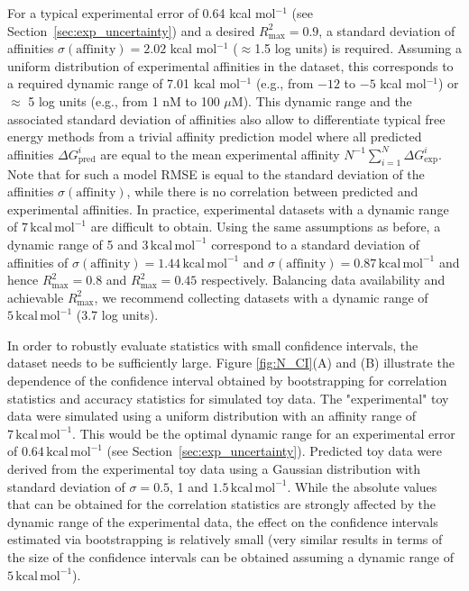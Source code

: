 \documentclass[9pt,bestpractices,pubversion]{livecoms}
\begin{document}
For a typical experimental error of 0.64 kcal mol$^{-1}$ (see Section~\ref{sec:exp_uncertainty}) and a desired $R^2_{\mathrm{max}} = 0.9$, a standard deviation of affinities $\sigma(\mathrm{affinity}) = 2.02 $ kcal mol$^{-1}$ ($\approx$1.5 log units) is required. Assuming a uniform distribution of experimental affinities in the dataset, this corresponds to a required dynamic range of 7.01 kcal mol$^{-1}$ (e.g., from $-12$ to $-5$ kcal mol$^{-1}$) or $\approx$ 5 log units (e.g., from 1 nM to 100 $\mu$M). This dynamic range and the associated standard deviation of affinities also allow to differentiate typical free energy methods from a trivial affinity prediction model where all predicted affinities $\Delta G_{\text{pred}}^i$ are equal to the mean experimental affinity $N^{-1}\sum_{i=1}^{N} \Delta G_{\text{exp}}^i$. Note that for such a model RMSE is equal to the standard deviation of the affinities $\sigma({\mathrm{affinity}})$, while there is no correlation between predicted and experimental affinities. In practice, experimental datasets with a dynamic range of $7\,\mathrm{kcal\,mol^{-1}}$ are difficult to obtain. Using the same assumptions as before, a dynamic range of 5 and $3\,\mathrm{kcal\,mol^{-1}}$ correspond to a standard deviation of affinities of $\sigma(\mathrm{affinity}) = 1.44\,\mathrm{kcal\,mol^{-1}}$ and $\sigma(\mathrm{affinity}) = 0.87\,\mathrm{kcal\,mol^{-1}}$ and hence $R^2_{\mathrm{max}} = 0.8$ and $R^2_{\mathrm{max}} = 0.45$ respectively. Balancing data availability and achievable $R^2_{\mathrm{max}}$, we recommend collecting datasets with a dynamic range of $5\,\mathrm{kcal\,mol^{-1}}$ (3.7 log units).



In order to robustly evaluate statistics with small confidence intervals, the dataset needs to be sufficiently large. 
Figure \ref{fig:N_CI}(A) and (B)  illustrate the dependence of the confidence interval obtained by bootstrapping for correlation statistics and accuracy statistics for simulated toy data. 
The "experimental" toy data were simulated using a uniform distribution with an affinity range of $7\,\mathrm{kcal\,mol^{-1}}$. 
This would be the optimal dynamic range for an experimental error of $0.64\,\mathrm{kcal\,mol^{-1}}$ (see Section~\ref{sec:exp_uncertainty}). 
Predicted toy data were derived from the experimental toy data using a Gaussian distribution with standard deviation of $\sigma = 0.5$, 1 and $1.5\,\mathrm{kcal\,mol^{-1}}$. 
While the absolute values that can be obtained for the correlation statistics are strongly affected by the dynamic range of the experimental data, the effect on the confidence intervals estimated via bootstrapping is relatively small (very similar results in terms of the size of the confidence intervals can be obtained assuming a dynamic range of $5\,\mathrm{kcal\,mol^{-1}}$).
\end{document}
